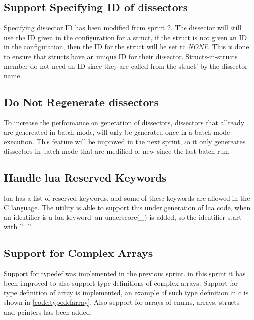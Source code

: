 \subsection{Support Specifying ID of \Glspl{dissector}}
Specifying \gls{dissector} ID has been modified from sprint 2. The \gls{dissector} will 
still use the ID given in the configuration for a struct, if the struct is not 
given an ID in the configuration, then the ID for the struct will be set to 
\emph{NONE}. This is done to ensure that structs have an unique ID for their 
\gls{dissector}. Structs-in-structs member do not need an ID since they are called 
from the struct' by the \gls{dissector} name.

\subsection{Do Not Regenerate \glspl{dissector}}
To increase the performance on generation of dissectors, dissectors that 
allready are genereated in batch mode, will only be generated once in a batch 
mode execution. This feature will be improved in the next sprint, so it only 
genereates dissectors in batch mode that are modified or new since the last 
batch run.

\subsection{Handle \Gls{lua} Reserved Keywords}
\Gls{lua} has a list of reserved keywords, and some of these keywords are allowed in 
the C language. The \gls{utility} is able to support this under generation of \Gls{lua} 
code, when an identifier is a lua keyword, an underscore(\_) is added, so the 
identifier start with ''\_''.

\subsection{Support for Complex Arrays}
Support for typedef was implemented in the previous sprint, in this sprint it 
has been improved to also support type definitions of complex arrays. Support 
for type definition of array is implemented, an example of such type 
definition in c is shown in \autoref{code:typedefarray}. Also support for 
arrays of enums, arrays, structs and pointers has been added.



